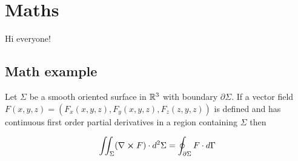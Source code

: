 \section{Maths}
Hi everyone!

\subsection{Math example}

\begin{theorem}
    Let \(\Sigma\) be a smooth oriented surface in \(\mathbb{R}^3\) with boundary \(\partial\Sigma\). If a vector field \(F(x, y, z) = (F_x(x, y, z), F_y(x, y, z), F_z(z, y, z))\) is defined and has continuous first order partial derivatives in a region containing \(\Sigma\) then

    \[
        \iint_\Sigma (\nabla \cross F) \cdot d^2\Sigma = \oint_{\partial\Sigma} F \cdot d\Gamma
    \]
\end{theorem}